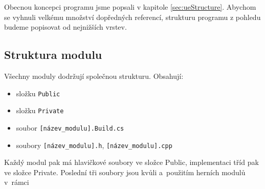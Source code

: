\FloatBarrier

Obecnou koncepci programu jsme popsali v kapitole  \ref{sec:ueStructure}. Abychom se vyhnuli velkému množství dopředných referencí, strukturu programu z pohledu \CPP{} budeme popisovat od nejnižších vrstev.

\subsection{Struktura modulu}
Všechny moduly dodržují společnou strukturu. Obsahují:
\begin{itemize}
	\item složku \verb!Public!
	\item složku \verb!Private!
	\item soubor \verb![název_modulu].Build.cs!
	\item soubory \verb![název_modulu].h!, \verb![název_modulu].cpp!
\end{itemize}


Každý modul pak má hlavičkové soubory ve složce Public, implementaci tříd pak ve složce Private. Poslední tři soubory jsou kvůli \UBT{} a~použitím herních modulů v~rámci \UE{}












